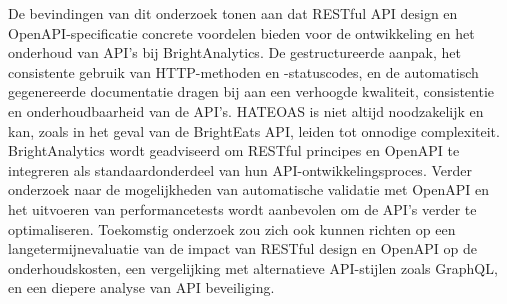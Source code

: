 \documentclass[a0,portrait]{hogent-poster}
\begin{document}
\begin{multicols}{2}
De bevindingen van dit onderzoek tonen aan dat RESTful API design en OpenAPI-specificatie concrete voordelen bieden voor de ontwikkeling en het onderhoud van API's bij BrightAnalytics. De gestructureerde aanpak, het consistente gebruik van HTTP-methoden en -statuscodes, en de automatisch gegenereerde documentatie dragen bij aan een verhoogde kwaliteit, consistentie en onderhoudbaarheid van de API's. HATEOAS is niet altijd noodzakelijk en kan, zoals in het geval van de BrightEats API, leiden tot onnodige complexiteit. BrightAnalytics wordt geadviseerd om RESTful principes en OpenAPI te integreren als standaardonderdeel van hun API-ontwikkelingsproces. Verder onderzoek naar de mogelijkheden van automatische validatie met OpenAPI en het uitvoeren van performancetests wordt aanbevolen om de API's verder te optimaliseren. Toekomstig onderzoek zou zich ook kunnen richten op een langetermijnevaluatie van de impact van RESTful design en OpenAPI op de onderhoudskosten, een vergelijking met alternatieve API-stijlen zoals GraphQL, en een diepere analyse van API beveiliging.

\end{multicols}
\end{document}

